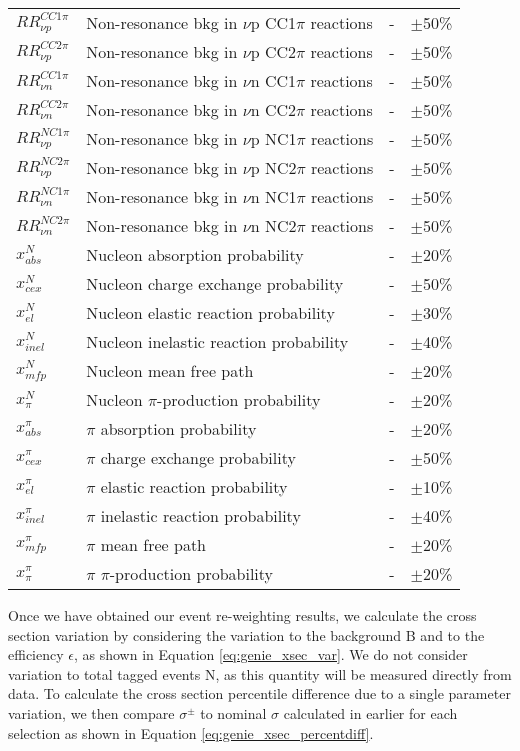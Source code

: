 \begin{table*}
\begin{tabular}{| l | l | l | l |}
$RR_{\nu p}^{CC1\pi}$ & Non-resonance bkg in $\nu$p CC1$\pi$ reactions & - & $\pm$50\% \\ 
$RR_{\nu p}^{CC2\pi}$ & Non-resonance bkg in $\nu$p CC2$\pi$ reactions & - & $\pm$50\% \\ 
$RR_{\nu n}^{CC1\pi}$ & Non-resonance bkg in $\nu$n CC1$\pi$ reactions & - & $\pm$50\% \\ 
$RR_{\nu n}^{CC2\pi}$ & Non-resonance bkg in $\nu$n CC2$\pi$ reactions & - & $\pm$50\% \\ 
$RR_{\nu p}^{NC1\pi}$ & Non-resonance bkg in $\nu$p NC1$\pi$ reactions & - & $\pm$50\% \\ 
$RR_{\nu p}^{NC2\pi}$ & Non-resonance bkg in $\nu$p NC2$\pi$ reactions & - & $\pm$50\% \\ 
$RR_{\nu n}^{NC1\pi}$ & Non-resonance bkg in $\nu$n NC1$\pi$ reactions & - & $\pm$50\% \\ 
$RR_{\nu n}^{NC2\pi}$ & Non-resonance bkg in $\nu$n NC2$\pi$ reactions & - & $\pm$50\% \\  \hline

$x_{abs}^{N}$ & Nucleon absorption probability & - & $\pm$20\% \\ 
$x_{cex}^{N}$ & Nucleon charge exchange probability & - & $\pm$50\% \\ 
$x_{el}^{N}$ & Nucleon elastic reaction probability & - & $\pm$30\% \\ 
$x_{inel}^{N}$ & Nucleon inelastic reaction probability & - & $\pm$40\% \\ 
$x_{mfp}^{N}$ & Nucleon mean free path & - & $\pm$20\% \\
$x_{\pi}^{N}$ & Nucleon $\pi$-production probability & - & $\pm$20\% \\
$x_{abs}^{\pi}$ & $\pi$ absorption probability & - & $\pm$20\% \\
$x_{cex}^{\pi}$ & $\pi$ charge exchange probability & - & $\pm$50\% \\
$x_{el}^{\pi}$ & $\pi$ elastic reaction probability & - & $\pm$10\% \\
$x_{inel}^{\pi}$ & $\pi$ inelastic reaction probability & - & $\pm$40\% \\
$x_{mfp}^{\pi}$ & $\pi$ mean free path & - & $\pm$20\% \\
$x_{\pi}^{\pi}$ & $\pi$ $\pi$-production probability & - & $\pm$20\% \\ \hline
\end{tabular}
\end{table*}

\par Once we have obtained our event re-weighting results, we calculate the cross section variation by considering the variation to the background B and to the efficiency $\epsilon$, as shown in Equation \ref{eq:genie_xsec_var}. We do not consider variation to total tagged events N, as this quantity will be measured directly from data.  To calculate the cross section percentile difference due to a single parameter variation, we then compare $\sigma^\pm$ to nominal $\sigma$ calculated in earlier for each selection as shown in Equation \ref{eq:genie_xsec_percentdiff}.

